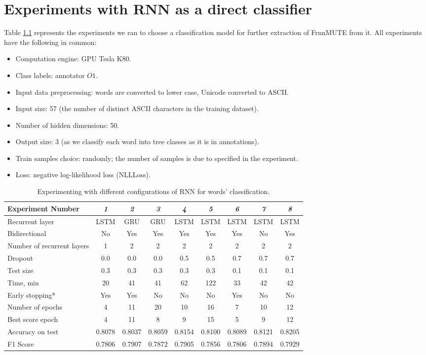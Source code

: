 \chapter{Experiments with RNN as a direct classifier}
\label{appx:rnn}

Table \ref{tab:rnn-experiments} represents the experiments we ran to choose a classification model for further extraction of FrnnMUTE from it. All experiments have the following in common:
\begin{itemize}
    \item Computation engine: GPU Tesla K80.
    \item Class labels: annotator $O1$.
    \item Input data preprocessing: words are converted to lower case, Unicode converted to ASCII.
    \item Input size: 57 (the number of distinct ASCII characters in the training dataset).
    \item Number of hidden dimensions: 50.
    \item Output size: 3 (as we classify each word into tree classes as it is in annotations).
    \item Train samples choice: randomly; the number of samples is due to specified in the experiment.
    \item Loss: negative log-likelihood loss (NLLLoss).
\end{itemize}

\begin{table}[h]
\begin{tabular}{l|cccccccc}
\hline
Experiment Number & \textit{1} & \textit{2} & \textit{3} & \textit{4} & \textit{5} & \textit{6} & \textit{7} & \textit{8} \\ \hline
Recurrent layer & LSTM & GRU & GRU & LSTM & LSTM & LSTM & LSTM & LSTM \\
Bidirectional & No & Yes & Yes & Yes & Yes & Yes & No & Yes \\
Number of recurrent layers & 1 & 2 & 2 & 2 & 2 & 2 & 2 & 2 \\
Dropout & 0.0 & 0.0 & 0.0 & 0.5 & 0.5 & 0.7 & 0.7 & 0.7 \\
Test size & 0.3 & 0.3 & 0.3 & 0.3 & 0.3 & 0.1 & 0.1 & 0.1 \\
Time, min & 20 & 41 & 41 & 62 & 122 & 33 & 42 & 42 \\
Early stopping* & Yes & Yes & No & No & No & Yes & No & No \\
Number of epochs & 4 & 11 & 20 & 10 & 16 & 7 & 10 & 12 \\
Best score epoch & 4 & 11 & 8 & 9 & 15 & 5 & 9 & 12 \\
Accuracy on test & 0.8078 & 0.8037 & 0.8059 & 0.8154 & 0.8100 & 0.8089 & 0.8121 & 0.8205 \\
F1 Score & 0.7806 & 0.7907 & 0.7872 & 0.7905 & 0.7856 & 0.7806 & 0.7894 & 0.7929 \\ \hline
\end{tabular}
  \caption{Experimenting with different configurations of RNN for words' classification.}
  \label{tab:rnn-experiments}
\end{table}

